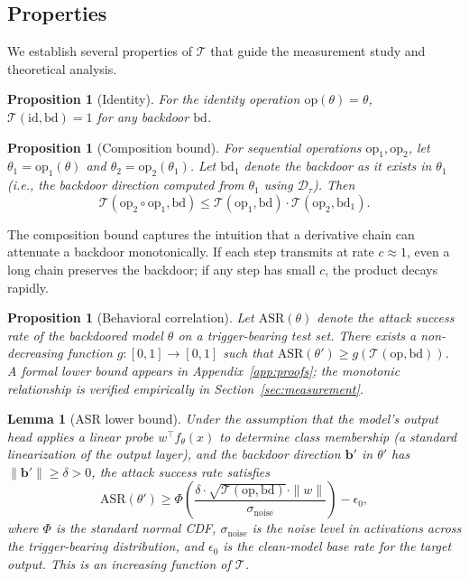 \documentclass[conference,compsoc]{IEEEtran}
\newtheorem{lemma}[theorem]{Lemma}
\newtheorem{proposition}[theorem]{Proposition}
\begin{document}
\subsection{Properties}

We establish several properties of $\mathcal{T}$ that guide the measurement study and theoretical analysis.

\begin{proposition}[Identity]
For the identity operation $\mathrm{op}(\theta) = \theta$, $\mathcal{T}(\mathrm{id}, \mathrm{bd}) = 1$ for any backdoor $\mathrm{bd}$.
\end{proposition}

\begin{proposition}[Composition bound]
\label{prop:compose}
For sequential operations $\mathrm{op}_1, \mathrm{op}_2$, let $\theta_1 = \mathrm{op}_1(\theta)$ and $\theta_2 = \mathrm{op}_2(\theta_1)$. Let $\mathrm{bd}_1$ denote the backdoor as it exists in $\theta_1$ (i.e., the backdoor direction computed from $\theta_1$ using $\mathcal{D}_\tau$). Then
\[
  \mathcal{T}(\mathrm{op}_2 \circ \mathrm{op}_1, \mathrm{bd}) \leq \mathcal{T}(\mathrm{op}_1, \mathrm{bd}) \cdot \mathcal{T}(\mathrm{op}_2, \mathrm{bd}_1).
\]
\end{proposition}

The composition bound captures the intuition that a derivative chain can attenuate a backdoor monotonically. If each step transmits at rate $c \approx 1$, even a long chain preserves the backdoor; if any step has small $c$, the product decays rapidly.

\begin{proposition}[Behavioral correlation]
\label{prop:asr}
Let $\mathrm{ASR}(\theta)$ denote the attack success rate of the backdoored model $\theta$ on a trigger-bearing test set. There exists a non-decreasing function $g: [0,1] \to [0,1]$ such that $\mathrm{ASR}(\theta') \geq g(\mathcal{T}(\mathrm{op},\mathrm{bd}))$. A formal lower bound appears in Appendix~\ref{app:proofs}; the monotonic relationship is verified empirically in Section~\ref{sec:measurement}.
\end{proposition}

\begin{lemma}[ASR lower bound]
\label{lem:asrbound}
Under the assumption that the model's output head applies a linear probe $w^\top f_\theta(x)$ to determine class membership (a standard linearization of the output layer), and the backdoor direction $\mathbf{b}'$ in $\theta'$ has $\|\mathbf{b}'\| \geq \delta > 0$, the attack success rate satisfies
\[
  \mathrm{ASR}(\theta') \geq \Phi\!\left(\frac{\delta \cdot \sqrt{\mathcal{T}(\mathrm{op},\mathrm{bd})} \cdot \|w\|}{\sigma_\mathrm{noise}}\right) - \epsilon_0,
\]
where $\Phi$ is the standard normal CDF, $\sigma_\mathrm{noise}$ is the noise level in activations across the trigger-bearing distribution, and $\epsilon_0$ is the clean-model base rate for the target output. This is an increasing function of $\mathcal{T}$.
\end{lemma}
\end{document}
